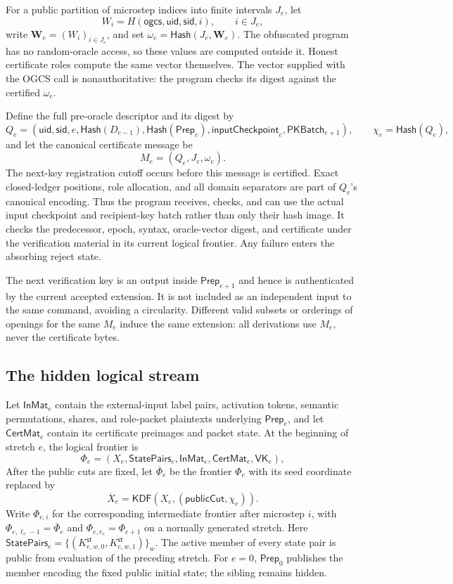 For a public partition of microstep indices into finite intervals $J_e$, let
\[
  W_i=H(\mathsf{ogcs},\mathsf{uid},\mathsf{sid},i),
  \qquad i\in J_e,
\]
write $\mathbf W_e=(W_i)_{i\in J_e}$, and set
$\omega_e=\mathsf{Hash}(J_e,\mathbf W_e)$.  The obfuscated program has no
random-oracle access, so these values are computed outside it.  Honest
certificate roles compute the same vector themselves.  The vector supplied
with the OGCS call is nonauthoritative: the program checks its digest against
the certified $\omega_e$.

Define the full pre-oracle descriptor and its digest by
\[
  Q_e=(\mathsf{uid},\mathsf{sid},e,
    \mathsf{Hash}(D_{e-1}),\mathsf{Hash}(\mathsf{Prep}_e),
    \mathsf{inputCheckpoint}_e,\mathsf{PKBatch}_{e+1}),
  \qquad
  \chi_e=\mathsf{Hash}(Q_e),
\]
and let the canonical certificate message be
\[
  M_e=(Q_e,J_e,\omega_e).
  \label{eq:checkpoint}
\]
The next-key registration cutoff occurs before this message is certified.
Exact closed-ledger positions, role allocation, and all domain separators are
part of $Q_e$'s canonical encoding.  Thus the program receives, checks, and
can use the actual input checkpoint and recipient-key batch rather than only
their hash image.  It checks the predecessor, epoch, syntax, oracle-vector
digest, and certificate under the verification material in its current
logical frontier.  Any failure enters the absorbing reject state.

The next verification key is an output inside $\mathsf{Prep}_{e+1}$ and hence
is authenticated by the current accepted extension.  It is not included as an
independent input to the same command, avoiding a circularity.  Different
valid subsets or orderings of openings for the same $M_e$ induce the same
extension: all derivations use $M_e$, never the certificate bytes.

\subsection{The hidden logical stream}

Let $\mathsf{InMat}_e$ contain the external-input label pairs, activation
tokens, semantic permutations, shares, and role-packet plaintexts underlying
$\mathsf{Prep}_e$, and let $\mathsf{CertMat}_e$ contain its certificate
preimages and packet state.  At the beginning of stretch $e$, the logical
frontier is
\[
  \Phi_e=\left(
    X_e,
    \mathsf{StatePairs}_e,
    \mathsf{InMat}_e,
    \mathsf{CertMat}_e,
    \mathsf{VK}_e
  \right),
  \label{eq:logical-frontier}
\]
After the public cuts are fixed, let $\overline\Phi_e$ be the frontier
$\Phi_e$ with its seed coordinate replaced by
\[
  \overline X_e=
    \mathsf{KDF}(X_e,(\mathsf{publicCut},\chi_e)).
\]
Write $\Phi_{e,i}$ for the corresponding intermediate frontier after
microstep $i$, with $\Phi_{e,\ell_e-1}=\overline\Phi_e$ and
$\Phi_{e,r_e}=\Phi_{e+1}$ on a normally generated stretch.  Here
$\mathsf{StatePairs}_e=
 \{(K^{\mathsf{st}}_{e,w,0},K^{\mathsf{st}}_{e,w,1})\}_w$.
The active member of every state pair is public from evaluation of the
preceding stretch.  For $e=0$, $\mathsf{Prep}_0$ publishes the member encoding
the fixed public initial state; the sibling remains hidden.

